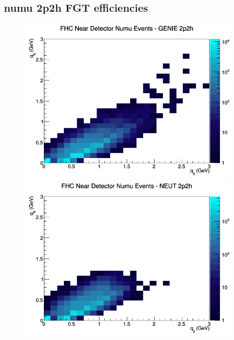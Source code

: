 \subsection{numu 2p2h FGT efficiencies}
\begin{figure}[h]
\includegraphics[width=\linewidth]{eff_q0_q3/FGT/2p2h_FHC_ND_numu_q3_q0_GENIE.png}
\endminipage
{}
\includegraphics[width=\linewidth]{eff_q0_q3/FGT/2p2h_FHC_ND_numu_q3_q0_NEUT.png}
\endminipage
{}

\end{figure}

